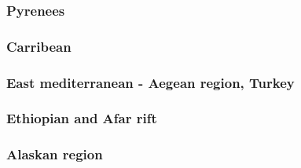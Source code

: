 \cite{bird78}
\cite{moln89}
\cite{moem93}
\cite{wibe94}
\cite{chmm95}
\cite{robk97}
\cite{cblk00}\cite{clro00}
\cite{bejn01}\cite{laav01}\cite{zemk01}\cite{tzrm01}
\cite{kozc02}
\cite{reta03}
\cite{bejn04}
\cite{clbr05}\cite{rost05a}\cite{rost05b}
\cite{clrw06}
\cite{busc08}
\cite{hamo10}
\cite{care13}\cite{mutg13}\cite{chgz13}\cite{chgz13b}
\cite{whbb14}
\cite{bube17}
\cite{pirf18}
\cite{sccs19}

\subsubsection*{Pyrenees} 

\cite{giju98}
\cite{bemh00}
\cite{mcmg04}
\cite{jaml10}
\cite{fihv13b}
\cite{dual19}

\subsubsection*{Carribean} 

\subsubsection*{East mediterranean - Aegean region, Turkey} 

\cite{cazf10}

\subsubsection*{Ethiopian and Afar rift} 

\cite{mitk07}
\cite{cort08}
\cite{kekj09}
\cite{beve10}
\cite{phcs14}
\cite{brcr17}
\cite{brcg17}
\cite{cocf19}

\subsubsection*{Alaskan region} 

